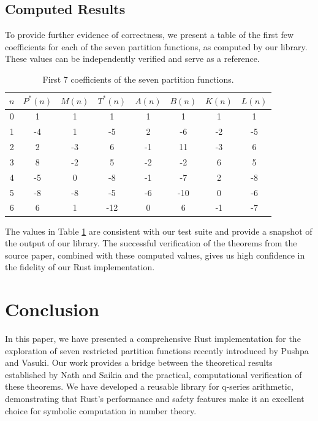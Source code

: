 \documentclass{article}
\begin{document}
\subsection{Computed Results}

To provide further evidence of correctness, we present a table of the first few coefficients for each of the seven partition functions, as computed by our library. These values can be independently verified and serve as a reference.

\begin{table}[h!]
\centering
\begin{tabular}{|c|c|c|c|c|c|c|c|}
\hline
$n$ & $P^*(n)$ & $M(n)$ & $T^*(n)$ & $A(n)$ & $B(n)$ & $K(n)$ & $L(n)$ \\
\hline
0 & 1 & 1 & 1 & 1 & 1 & 1 & 1 \\
1 & -4 & 1 & -5 & 2 & -6 & -2 & -5 \\
2 & 2 & -3 & 6 & -1 & 11 & -3 & 6 \\
3 & 8 & -2 & 5 & -2 & -2 & 6 & 5 \\
4 & -5 & 0 & -8 & -1 & -7 & 2 & -8 \\
5 & -8 & -8 & -5 & -6 & -10 & 0 & -6 \\
6 & 6 & 1 & -12 & 0 & 6 & -1 & -7 \\
\hline
\end{tabular}
\caption{First 7 coefficients of the seven partition functions.}
\label{tab:coeffs}
\end{table}

The values in Table \ref{tab:coeffs} are consistent with our test suite and provide a snapshot of the output of our library. The successful verification of the theorems from the source paper, combined with these computed values, gives us high confidence in the fidelity of our Rust implementation.

\section{Conclusion}

In this paper, we have presented a comprehensive Rust implementation for the exploration of seven restricted partition functions recently introduced by Pushpa and Vasuki. Our work provides a bridge between the theoretical results established by Nath and Saikia and the practical, computational verification of these theorems. We have developed a reusable library for q-series arithmetic, demonstrating that Rust's performance and safety features make it an excellent choice for symbolic computation in number theory.
\end{document}
